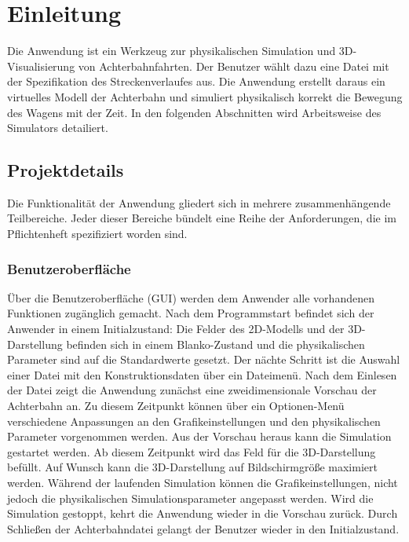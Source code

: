 
\chapter{Einleitung}

Die Anwendung ist ein Werkzeug zur physikalischen Simulation und 3D-Visualisierung von Achterbahnfahrten.
Der Benutzer wählt dazu eine Datei mit der Spezifikation des Streckenverlaufes aus. Die Anwendung erstellt 
daraus ein virtuelles Modell der Achterbahn und simuliert physikalisch korrekt die Bewegung des Wagens mit
der Zeit. In den folgenden Abschnitten wird Arbeitsweise des Simulators detailiert.

\section{Projektdetails}
Die Funktionalität der Anwendung gliedert sich in mehrere zusammenhängende Teilbereiche. Jeder dieser
Bereiche bündelt eine Reihe der Anforderungen, die im Pflichtenheft spezifiziert worden sind.

\subsection{Benutzeroberfläche}
Über die Benutzeroberfläche (GUI) werden dem Anwender alle vorhandenen Funktionen zugänglich gemacht.
Nach dem Programmstart befindet sich der Anwender in einem Initialzustand: Die Felder des 2D-Modells
und der 3D-Darstellung befinden sich in einem Blanko-Zustand und die physikalischen Parameter sind
auf die Standardwerte gesetzt. Der nächte Schritt ist die Auswahl einer Datei mit den Konstruktionsdaten
über ein Dateimenü. Nach dem Einlesen der Datei zeigt die Anwendung zunächst eine zweidimensionale 
Vorschau der Achterbahn an. Zu diesem Zeitpunkt können über ein Optionen-Menü verschiedene Anpassungen 
an den Grafikeinstellungen und den physikalischen Parameter vorgenommen werden. 
Aus der Vorschau heraus kann die Simulation gestartet werden. Ab diesem Zeitpunkt wird das Feld für 
die 3D-Darstellung befüllt. Auf Wunsch kann die 3D-Darstellung auf Bildschirmgröße
maximiert werden. Während der laufenden Simulation können die Grafikeinstellungen, nicht jedoch
die physikalischen Simulationsparameter angepasst werden. Wird die Simulation gestoppt, kehrt die Anwendung
wieder in die Vorschau zurück. Durch Schließen der Achterbahndatei gelangt der Benutzer wieder in den 
Initialzustand.

